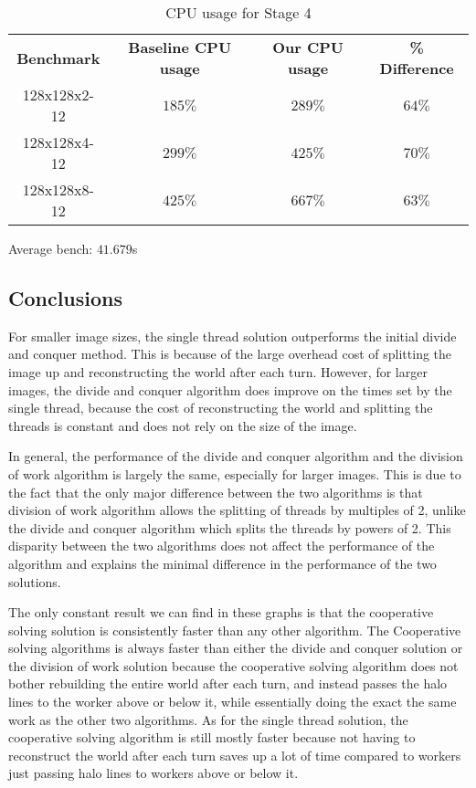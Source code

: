 \documentclass[11pt,a4paper,dvipsnames,cmyk]{scrartcl}
\begin{document}
\begin{table}[ht]
\caption{CPU usage for Stage 4}
\begin{center}
    \begin{tabular}{|c|c|c|c|}
        \hline
        \textbf{Benchmark} & \textbf{Baseline CPU usage} &
        \textbf{Our CPU usage} & \textbf{\% Difference} \\ \hhline{|=|=|=|=|}
        128x128x2-12 & $185\%$ & $289\%$ & $64\%$ \\ \hline
        128x128x4-12 & $299\%$ & $425\%$ & $70\%$ \\ \hline
        128x128x8-12 & $425\%$ & $667\%$ & $63\%$ \\ \hline
    \end{tabular}
\end{center}
\end{table}



Average bench: $41.679$s

\subsection*{Conclusions}%
\label{sub:Conclusions}
For smaller image sizes, the single thread solution outperforms the
initial divide and conquer method. This is because of the large overhead
cost of splitting the image up and reconstructing the world after each
turn.  However, for larger images, the divide and conquer algorithm does
improve on the times set by the single thread, because the cost of
reconstructing the world and splitting the threads is constant and does
not rely on the size of the image.

In general, the performance of the divide and conquer algorithm and the division of work algorithm is largely the same, especially for larger images. This is due to the fact that the only major difference between the two algorithms is that division of work algorithm allows the splitting of threads by multiples of 2, unlike the divide and conquer algorithm which splits the threads by powers of 2. This disparity between the two algorithms does not affect the performance of the algorithm and explains the minimal difference in the performance of the two solutions.

The only constant result we can find in these graphs is that the cooperative solving solution is consistently faster than any other algorithm. The Cooperative solving algorithms is always faster than either the divide and conquer solution or the division of work solution because the cooperative solving algorithm does not bother rebuilding the entire world after each turn, and instead passes the halo lines to the worker above or below it, while essentially doing the exact the same work as the other two algorithms. As for the single thread solution, the cooperative solving algorithm is still mostly faster because not having to reconstruct the world after each turn saves up a lot of time compared to workers just passing halo lines to workers above or below it. 
\end{document}
